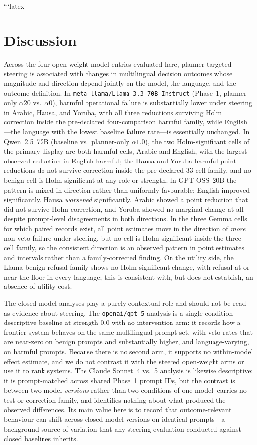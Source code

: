 ```latex
\section{Discussion}

Across the four open-weight model entries evaluated here, planner-targeted
steering is associated with changes in multilingual decision outcomes whose
magnitude and direction depend jointly on the model, the language, and the
outcome definition. In \texttt{meta-llama/Llama-3.3-70B-Instruct} (Phase~1,
planner-only $\alpha20$ vs.\ $\alpha0$), harmful operational failure is
substantially lower under steering in Arabic, Hausa, and Yoruba, with all three
reductions surviving Holm correction inside the pre-declared four-comparison
harmful family, while English---the language with the lowest baseline failure
rate---is essentially unchanged. In Qwen~2.5~72B (baseline vs.\ planner-only
$\alpha1.0$), the two Holm-significant cells of the primary display are both
harmful cells, Arabic and English, with the largest observed reduction in
English harmful; the Hausa and Yoruba harmful point reductions do not survive
correction inside the pre-declared 33-cell family, and no benign cell is
Holm-significant at any role or strength. In GPT-OSS~20B the pattern is
mixed in direction rather than uniformly favourable: English improved
significantly, Hausa \emph{worsened} significantly, Arabic showed a point
reduction that did not survive Holm correction, and Yoruba showed no marginal
change at all despite prompt-level disagreements in both directions. In the three
Gemma cells for which paired records exist, all point estimates move in the
direction of \emph{more} non-veto failure under steering, but no cell is
Holm-significant inside the three-cell family, so the consistent direction is an
observed pattern in point estimates and intervals rather than a family-corrected
finding. On the utility side, the Llama benign refusal family shows no
Holm-significant change, with refusal at or near the floor in every language;
this is consistent with, but does not establish, an absence of utility cost.

The closed-model analyses play a purely contextual role and should not be read as
evidence about steering. The \texttt{openai/gpt-5} analysis is a single-condition
descriptive baseline at strength $0.0$ with no intervention arm: it records how a
frontier system behaves on the same multilingual prompt set, with veto rates that
are near-zero on benign prompts and substantially higher, and language-varying,
on harmful prompts. Because there is no second arm, it supports no within-model
effect estimate, and we do not contrast it with the steered open-weight arms or
use it to rank systems. The Claude Sonnet~4 vs.~5 analysis is likewise
descriptive: it is prompt-matched across shared Phase~1 prompt IDs, but the
contrast is between two model \emph{versions} rather than two conditions of one
model, carries no test or correction family, and identifies nothing about what
produced the observed differences. Its main value here is to record that
outcome-relevant behaviour can shift across closed-model versions on identical
prompts---a background source of variation that any steering evaluation
conducted against closed baselines inherits.

